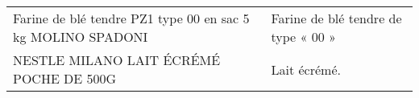 \begin{longtable}{p{5cm}p{10cm}}
                                              Farine de blé tendre PZ1 type 00 en sac 5 kg MOLINO SPADONI &                                                                                                                                                                                                                                                                                                                                                                                                                                                                                                                                                                                                                                                                                                                                                                                                                                                                                                                                                                                                      Farine de blé tendre de type « 00 » \\
                                                                  NESTLE MILANO LAIT ÉCRÉMÉ POCHE DE 500G &                                                                                                                                                                                                                                                                                                                                                                                                                                                                                                                                                                                                                                                                                                                                                                                                                                                                                                                                                                                                                             Lait écrémé. \\

\end{longtable}
